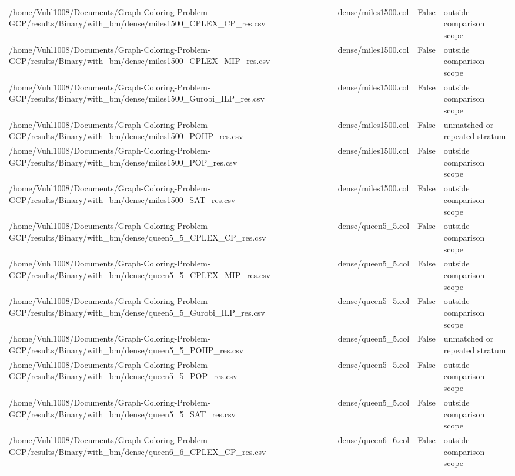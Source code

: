 \begin{table}[htbp]
\begin{tabular}{llll}
/home/Vuhl1008/Documents/Graph-Coloring-Problem-GCP/results/Binary/with\_bm/dense/miles1500\_CPLEX\_CP\_res.csv & dense/miles1500.col & False & outside comparison scope \\
/home/Vuhl1008/Documents/Graph-Coloring-Problem-GCP/results/Binary/with\_bm/dense/miles1500\_CPLEX\_MIP\_res.csv & dense/miles1500.col & False & outside comparison scope \\
/home/Vuhl1008/Documents/Graph-Coloring-Problem-GCP/results/Binary/with\_bm/dense/miles1500\_Gurobi\_ILP\_res.csv & dense/miles1500.col & False & outside comparison scope \\
/home/Vuhl1008/Documents/Graph-Coloring-Problem-GCP/results/Binary/with\_bm/dense/miles1500\_POHP\_res.csv & dense/miles1500.col & False & unmatched or repeated stratum \\
/home/Vuhl1008/Documents/Graph-Coloring-Problem-GCP/results/Binary/with\_bm/dense/miles1500\_POP\_res.csv & dense/miles1500.col & False & outside comparison scope \\
/home/Vuhl1008/Documents/Graph-Coloring-Problem-GCP/results/Binary/with\_bm/dense/miles1500\_SAT\_res.csv & dense/miles1500.col & False & outside comparison scope \\
/home/Vuhl1008/Documents/Graph-Coloring-Problem-GCP/results/Binary/with\_bm/dense/queen5\_5\_CPLEX\_CP\_res.csv & dense/queen5\_5.col & False & outside comparison scope \\
/home/Vuhl1008/Documents/Graph-Coloring-Problem-GCP/results/Binary/with\_bm/dense/queen5\_5\_CPLEX\_MIP\_res.csv & dense/queen5\_5.col & False & outside comparison scope \\
/home/Vuhl1008/Documents/Graph-Coloring-Problem-GCP/results/Binary/with\_bm/dense/queen5\_5\_Gurobi\_ILP\_res.csv & dense/queen5\_5.col & False & outside comparison scope \\
/home/Vuhl1008/Documents/Graph-Coloring-Problem-GCP/results/Binary/with\_bm/dense/queen5\_5\_POHP\_res.csv & dense/queen5\_5.col & False & unmatched or repeated stratum \\
/home/Vuhl1008/Documents/Graph-Coloring-Problem-GCP/results/Binary/with\_bm/dense/queen5\_5\_POP\_res.csv & dense/queen5\_5.col & False & outside comparison scope \\
/home/Vuhl1008/Documents/Graph-Coloring-Problem-GCP/results/Binary/with\_bm/dense/queen5\_5\_SAT\_res.csv & dense/queen5\_5.col & False & outside comparison scope \\
/home/Vuhl1008/Documents/Graph-Coloring-Problem-GCP/results/Binary/with\_bm/dense/queen6\_6\_CPLEX\_CP\_res.csv & dense/queen6\_6.col & False & outside comparison scope \\

\end{tabular}
\end{table}
